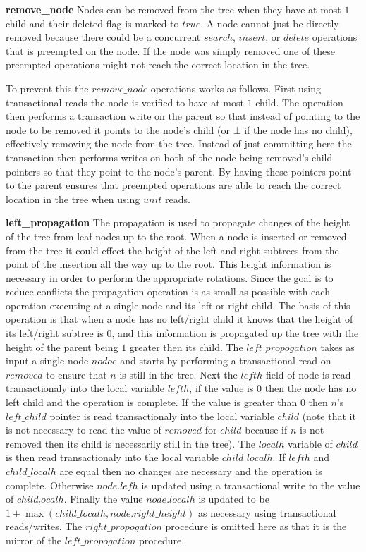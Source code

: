 \documentclass[10pt]{sigplanconf}
\begin{document}
{\bf remove\_node} Nodes can be removed from the tree when they have at most $1$ child and their deleted flag is marked to $true$.
A node cannot just be directly removed because there could be a concurrent $search$, $insert$, or $delete$ operations that is preempted on the node.
If the node was simply removed one of these preempted operations might not reach the correct location in the tree.

To prevent this the $remove\_node$ operations works as follows.
First using transactional reads the node is verified to have at most $1$ child.
The operation then performs a transaction write on the parent so that instead of pointing to the node to be removed it points to the node's child (or $\bot$ if the node has no child), effectively removing the node from the tree.
Instead of just committing here the transaction then performs writes on both of the node being removed's child pointers so that they point to the node's parent.
By having these pointers point to the parent ensures that preempted operations are able to reach the correct location in the tree when using $unit$ reads.

{\bf left\_propagation} The propagation is used to propagate changes of the height of the tree from leaf nodes up to the root.
When a node is inserted or removed from the tree it could effect the height of the left and right subtrees from the point of the insertion all the way up to the root.
This height information is necessary in order to perform the appropriate rotations.
Since the goal is to reduce conflicts the propagation operation is as small as possible with each operation executing at a single node and its left or right child.
The basis of this operation is that when a node has no left/right child it knows that the height of its left/right subtree is $0$, and this information is propagated up the tree with the height of the parent being $1$ greater then its child.
The $left\_propogation$ takes as input a single node $nodoe$ and starts by performing a transactional read on $removed$ to ensure that $n$ is still in the tree.
Next the $lefth$ field of node is read transactionaly into the local variable $lefth$, if the value is $0$ then the node has no left child and the operation is complete.
If the value is greater than $0$ then $n$'s $left\_child$ pointer is read transactionaly into the local variable $child$ (note that it is not necessary to read the value of
$removed$ for $child$ because if $n$ is not removed then its child is necessarily still in the tree).
The $localh$ variable of $child$ is then read transactionaly into the local variable $child\_localh$.
If $lefth$ and $child\_localh$ are equal then no changes are necessary and the operation is complete.
Otherwise $node.lefh$ is updated using a transactional write to the value of $child_localh$.
Finally the value $node.localh$ is updated to be $1 + \max(child\_localh, node.right\_height)$ as necessary using transactional reads/writes.
The $right\_propogation$ procedure is omitted here as that it is the mirror of the $left\_propogation$ procedure.
\end{document}

